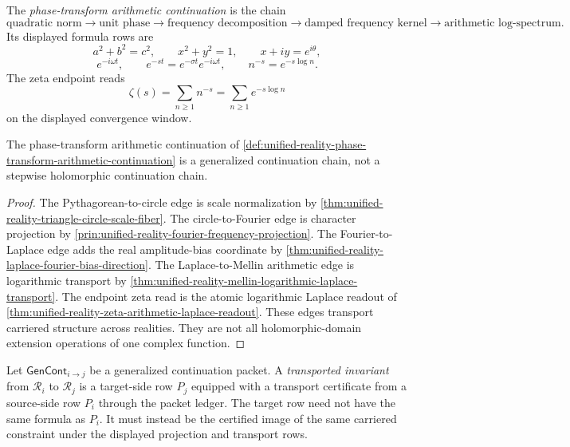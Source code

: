 \begin{definition}
\label{def:unified-reality-phase-transform-arithmetic-continuation}
The \emph{phase-transform arithmetic continuation} is the chain
$$
\text{quadratic norm}
\to
\text{unit phase}
\to
\text{frequency decomposition}
\to
\text{damped frequency kernel}
\to
\text{arithmetic log-spectrum}.
$$
Its displayed formula rows are
$$
a^2+b^2=c^2,
\qquad
x^2+y^2=1,
\qquad
x+iy=e^{i\theta},
$$
$$
e^{-i\omega t},
\qquad
e^{-st}=e^{-\sigma t}e^{-i\omega t},
\qquad
n^{-s}=e^{-s\log n}.
$$
The zeta endpoint reads
$$
\zeta(s)
=
\sum_{n\ge1}n^{-s}
=
\sum_{n\ge1}e^{-s\log n}
$$
on the displayed convergence window.
\end{definition}

\begin{theorem}
\label{thm:unified-reality-phase-transform-chain-generalized-continuation}
The phase-transform arithmetic continuation of
\autoref{def:unified-reality-phase-transform-arithmetic-continuation} is
a generalized continuation chain, not a stepwise holomorphic
continuation chain.
\end{theorem}

\begin{proof}
The Pythagorean-to-circle edge is scale normalization by
\autoref{thm:unified-reality-triangle-circle-scale-fiber}. The
circle-to-Fourier edge is character projection by
\autoref{prin:unified-reality-fourier-frequency-projection}. The
Fourier-to-Laplace edge adds the real amplitude-bias coordinate by
\autoref{thm:unified-reality-laplace-fourier-bias-direction}. The
Laplace-to-Mellin arithmetic edge is logarithmic transport by
\autoref{thm:unified-reality-mellin-logarithmic-laplace-transport}. The
endpoint zeta read is the atomic logarithmic Laplace readout of
\autoref{thm:unified-reality-zeta-arithmetic-laplace-readout}. These
edges transport carriered structure across realities. They are not all
holomorphic-domain extension operations of one complex function.
\end{proof}

\begin{definition}
\label{def:unified-reality-transported-invariant}
Let $\mathsf{GenCont}_{i\to j}$ be a generalized continuation packet. A
\emph{transported invariant} from $\mathcal R_i$ to $\mathcal R_j$ is a
target-side row $P_j$ equipped with a transport certificate from a
source-side row $P_i$ through the packet ledger. The target row need not
have the same formula as $P_i$. It must instead be the certified image
of the same carriered constraint under the displayed projection and
transport rows.
\end{definition}

